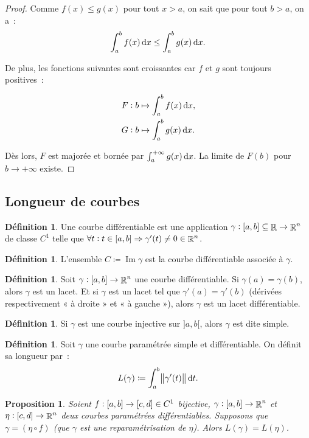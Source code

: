 \documentclass{article}
\DeclareMathOperator{\Imf}{Im}
\DeclareMathOperator{\R}{\mathbb R}
\newcommand{\ab}{\interval ab}
\newtheorem{prp}[thm]{Proposition}
\theoremstyle{definition}
\newtheorem{déf}[thm]{Définition}
\theoremstyle{remark}
\begin{document}
		\begin{proof} Comme $f(x) \leq g(x)$ pour tout $x > a$, on sait que pour tout $b > a$, on a~:
		\[\int_a^bf(x)\dif x \leq \int_a^bg(x)\dif x.\]

		De plus, les fonctions suivantes sont croissantes car $f$ et $g$ sont toujours positives~:

		\begin{align*}
			&F : b \mapsto \int_a^bf(x)\dif x, \\
			&G : b \mapsto \int_a^bg(x)\dif x.
		\end{align*}

		Dès lors, $F$ est majorée et bornée par $\int_a^{+\infty}g(x)\dif x$. La limite de $F(b)$ pour $b \to +\infty$ existe. \end{proof}

	\subsection{Longueur de courbes}

		\begin{déf} Une courbe différentiable est une application $\gamma : \ab \subseteq \R \to \R^n$ de classe $C^1$ telle que
		$\forall t : t \in \ab \Rightarrow \gamma'(t) \neq 0 \in \R^n$. \end{déf}

		\begin{déf} L'ensemble $C \coloneqq \Imf \gamma$ est la courbe différentiable associée à $\gamma$. \end{déf}

		\begin{déf} Soit $\gamma : \ab \to \R^n$ une courbe différentiable. Si $\gamma(a) = \gamma(b)$, alors $\gamma$ est un lacet. Et si $\gamma$
		est un lacet tel que $\gamma'(a) = \gamma'(b)$ (dérivées respectivement « à droite » et « à gauche »), alors $\gamma$ est un lacet différentiable.
		\end{déf}

		\begin{déf} Si $\gamma$ est une courbe injective sur $]a, b[$, alors $\gamma$ est dite simple. \end{déf}

		\begin{déf} Soit $\gamma$ une courbe paramétrée simple et différentiable. On définit sa longueur par~:
		\[L(\gamma) \coloneqq \int_a^b\norm{\gamma'(t)}\dif t.\]
		\end{déf}

		\begin{prp} Soient $f : \ab \to \interval cd \in C^1$ bijective, $\gamma : \ab \to \R^n$ et $\eta : \interval cd \to \R^n$ deux courbes
		paramétrées différentiables. Supposons que $\gamma = (\eta \circ f)$ (que $\gamma$ est une reparamétrisation de $\eta$). Alors
		$L(\gamma) = L(\eta)$. \end{prp}
\end{document}
